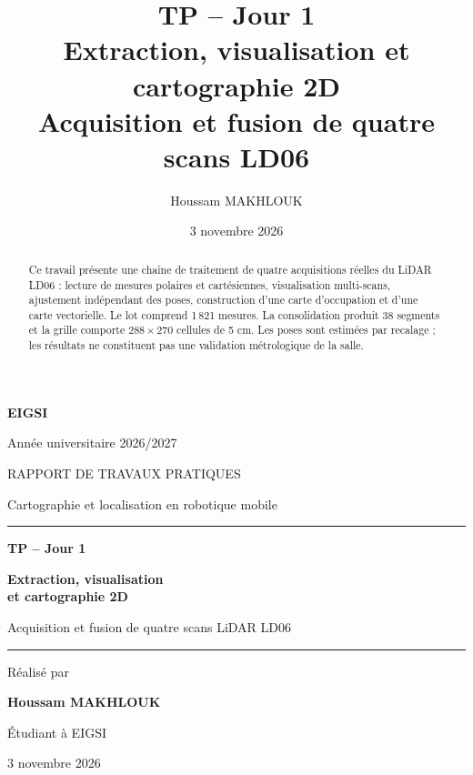 \documentclass[11pt,a4paper]{article}
\title{TP -- Jour 1\\Extraction, visualisation et cartographie 2D\\\large Acquisition et fusion de quatre scans LD06}
\author{Houssam MAKHLOUK}
\date{3 novembre 2026}
\begin{document}
\hypersetup{pageanchor=false}
\begin{titlepage}
\thispagestyle{empty}
\centering
\vspace*{1.0cm}
{\Large\bfseries EIGSI\par}
\vspace{0.35cm}
{\large Ann\'ee universitaire 2026/2027\par}
\vspace{1.5cm}
{\large RAPPORT DE TRAVAUX PRATIQUES\par}
\vspace{0.4cm}
{\large Cartographie et localisation en robotique mobile\par}
\vspace{0.8cm}
{\color{blue!45!black}\rule{0.88\textwidth}{1.2pt}\par}
\vspace{0.6cm}
{\Huge\bfseries TP -- Jour 1\par}
\vspace{0.5cm}
{\LARGE\bfseries Extraction, visualisation\\[0.15cm]et cartographie 2D\par}
\vspace{0.65cm}
{\large Acquisition et fusion de quatre scans LiDAR LD06\par}
\vspace{0.6cm}
{\color{blue!45!black}\rule{0.88\textwidth}{1.2pt}\par}
\vfill
{\large R\'ealis\'e par\par}
\vspace{0.3cm}
{\LARGE\bfseries Houssam MAKHLOUK\par}
\vspace{0.3cm}
{\large \'Etudiant \`a EIGSI\par}
\vfill
{\large 3 novembre 2026\par}
\vspace*{0.6cm}
\end{titlepage}

\hypersetup{pageanchor=true}
\setcounter{tocdepth}{2}
\tableofcontents
\thispagestyle{plain}
\clearpage
{}

\begin{abstract}
Ce travail présente une chaîne de traitement de quatre acquisitions réelles du LiDAR LD06 : lecture de mesures polaires et cartésiennes, visualisation multi-scans, ajustement indépendant des poses, construction d'une carte d'occupation et d'une carte vectorielle. Le lot comprend 1\,821 mesures. La consolidation produit 38 segments et la grille comporte $288\times270$ cellules de 5 cm. Les poses sont estimées par recalage ; les résultats ne constituent pas une validation métrologique de la salle.
\end{abstract}
\end{document}
